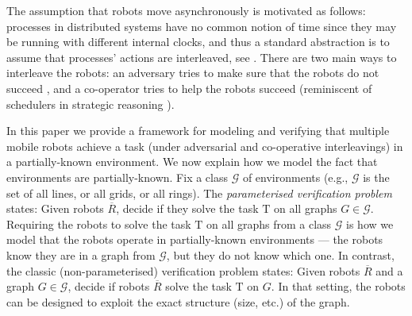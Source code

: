 \documentclass{llncs}
\newtheorem{example}{Example}
\def\gclass{\mathcal{G}}
\def\T{\mathrm{T}}
\def\nat{\mathbb{N}}
\newcommand{\tup}[1]{\overline{#1}}
\begin{document}
The assumption that robots move asynchronously is motivated as follows: processes in distributed systems have no common notion of time since they may be running with different internal clocks, and thus a standard abstraction is to assume that processes' actions are interleaved, see \cite{Lynch96}. There are two main ways to interleave the robots: an adversary tries to make sure that the robots do not succeed \cite{FPSW99}, and a co-operator tries to help the robots succeed (reminiscent of schedulers in strategic reasoning \cite{CLMM14}).



In this paper we provide a framework for modeling and verifying that multiple mobile robots achieve a task (under adversarial and co-operative interleavings) in a partially-known environment. We now explain how we model the fact that environments are partially-known. Fix a class $\gclass$ of environments (e.g., $\gclass$ is the set of all lines, or all grids, or all rings). The {\em parameterised verification problem} states: Given robots $\tup{R}$, decide if they solve the task $\T$ on all graphs $G \in \gclass$. Requiring the robots to solve the task $\T$ on all graphs from a class $\gclass$ is how we model that the robots operate in partially-known environments --- the robots know they are in a graph from $\gclass$, but they do not know which one. In contrast, the classic (non-parameterised) verification problem states: Given robots $\tup{R}$ and a graph $G \in \gclass$, decide if robots $\tup{R}$ solve the task $\T$ on $G$. In that setting, the robots can be designed to exploit the exact structure (size, etc.) of the graph.

\end{document}
